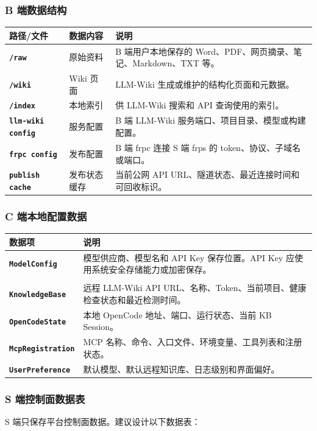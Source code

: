 \documentclass[UTF8,a4paper,12pt,fontset=fandol]{ctexart}
\newcommand{\code}[1]{\texttt{\footnotesize #1}}
\begin{document}
\subsubsection{B 端数据结构}
\begin{longtable}{>{\bfseries}p{3.0cm}p{4.0cm}p{7.0cm}}
\toprule
路径/文件 & 数据内容 & 说明 \\
\midrule
\code{/raw} & 原始资料 & B 端用户本地保存的 Word、PDF、网页摘录、笔记、Markdown、TXT 等。 \\
\code{/wiki} & Wiki 页面 & LLM-Wiki 生成或维护的结构化页面和元数据。 \\
\code{/index} & 本地索引 & 供 LLM-Wiki 搜索和 API 查询使用的索引。 \\
\code{llm-wiki config} & 服务配置 & B 端 LLM-Wiki 服务端口、项目目录、模型或构建配置。 \\
\code{frpc config} & 发布配置 & B 端 frpc 连接 S 端 frps 的 token、协议、子域名或端口。 \\
\code{publish cache} & 发布状态缓存 & 当前公网 API URL、隧道状态、最近连接时间和可回收标识。 \\
\bottomrule
\end{longtable}

\subsubsection{C 端本地配置数据}
\begin{longtable}{>{\bfseries}p{3.2cm}p{11.0cm}}
\toprule
数据项 & 说明 \\
\midrule
\code{ModelConfig} & 模型供应商、模型名和 API Key 保存位置。API Key 应使用系统安全存储能力或加密保存。 \\
\begin{tabular}[t]{@{}l@{}}\code{Remote}\\\code{KnowledgeBase}\end{tabular} & 远程 LLM-Wiki API URL、名称、Token、当前项目、健康检查状态和最近检测时间。 \\
\code{OpenCodeState} & 本地 OpenCode 地址、端口、运行状态、当前 KB Session。 \\
\code{McpRegistration} & MCP 名称、命令、入口文件、环境变量、工具列表和注册状态。 \\
\code{UserPreference} & 默认模型、默认远程知识库、日志级别和界面偏好。 \\
\bottomrule
\end{longtable}

\subsubsection{S 端控制面数据表}
S 端只保存平台控制面数据。建议设计以下数据表：
\end{document}
